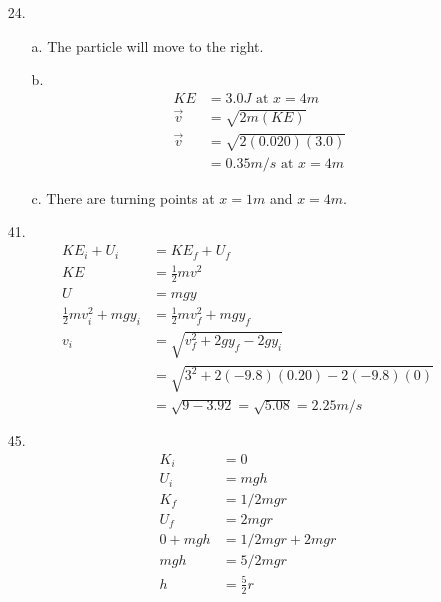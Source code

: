     \begin{itemize}
        \item [24.]
        
        \begin{itemize}
            \item [a.]
            The particle will move to the right.

            \item [b.]
            \begin{align*}
                KE      & = 3.0 J \text{ at } x=4m  \\
                \vec{v} & = \sqrt{2m(KE)}           \\
                \vec{v} & = \sqrt{2(0.020)(3.0)}    \\
                        & = \boxed{0.35m/s \text{ at } x=4 m}
            \end{align*}

            \item [c.]
            There are turning points at $x=1m$ and $x=4m$.

        \end{itemize}

        \item [41.]
        \begin{align*}
            KE_{i} + U_{i}  & = KE_{f} + U_{f}                                      \\
            KE              & = \frac{1}{2}mv^{2}                                   \\
            U               & = mgy                                                 \\
            \frac{1}{2}mv^{2}_{i} + mgy_{i} & = \frac{1}{2}mv^{2}_{f} + mgy_{f}     \\
            v_{i}           & = \sqrt{v_{f}^{2}+2gy_{f}-2gy_{i}}                    \\
                            & = \sqrt{3^{2} + 2(-9.8)(0.20) - 2(-9.8)(0)}           \\
                            & = \sqrt{9 - 3.92} = \sqrt{5.08} = \boxed{2.25m/s}
        \end{align*}

        \item [45.]
        \begin{align*}
            K_{i}   & = 0               \\
            U_{i}   & = mgh             \\
            K_{f}   & = 1/2mgr          \\
            U_{f}   & = 2mgr            \\
            0 + mgh & = 1/2mgr + 2mgr   \\
            mgh     & = 5/2mgr          \\
            h       & = \boxed{\frac{5}{2}r}
        \end{align*}


\end{itemize}

